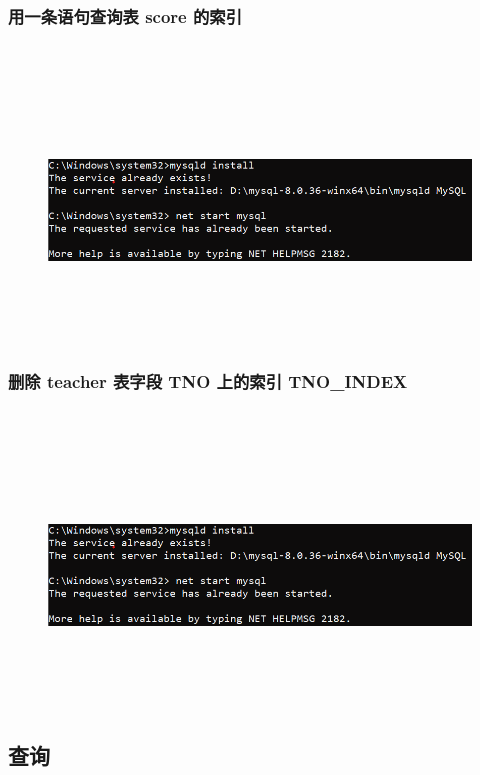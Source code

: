 \documentclass{ctexart}
\begin{document}
\subsubsection{用一条语句查询表 score 的索引}
\begin{lstlisting}[language=sql]
	
\end{lstlisting}
\begin{figure}[H]
	\centering 
	\includegraphics[height=7cm,width=14cm]{1.png}
	\end{figure}
\subsubsection{删除 teacher 表字段 TNO 上的索引 TNO\_INDEX}
\begin{lstlisting}[language=sql]
	
\end{lstlisting}
\begin{figure}[H]
	\centering 
	\includegraphics[height=7cm,width=14cm]{1.png}
	\end{figure}
\subsection{查询}
\end{document}
